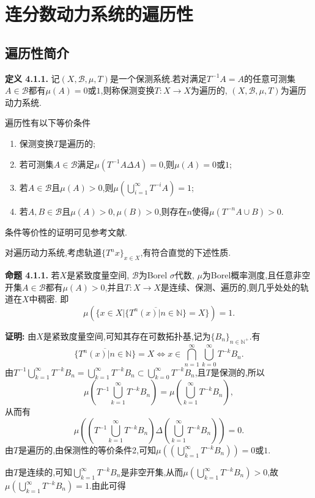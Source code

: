\section{连分数动力系统的遍历性}
\subsection{遍历性简介}
\textbf{定义 4.1.1.  }
记$(X,\mathcal{B},\mu,T)$是一个保测系统.若对满足$T^{-1}A=A$的任意可测集$A\in\mathcal{B}$都有$\mu(A)=0$或$1$,则称保测变换$T:X\to X$为遍历的, $(X,\mathcal{B},\mu,T)$为遍历动力系统.
\par
遍历性有以下等价条件
\begin{enumerate}
    \item 保测变换$T$是遍历的;
    \item 若可测集$A\in\mathcal{B}$满足$\mu(T^{-1}A\Delta A)=0$,则$\mu(A)=0$或$1$;
    \item 若$A\in\mathcal{B}$且$\mu(A)>0$,则$\mu(\bigcup\limits_{i=1}^{\infty}T^{-i}A)=1$;
    \item 若$A,B\in\mathcal{B}$且$\mu(A)>0,\mu(B)>0$,则存在$n$使得$\mu(T^{-n}A\cup B)>0$.
\end{enumerate}\par
条件等价性的证明可见参考文献\cite{Ergodic_Sun,Ergodic_theory}.\par
对遍历动力系统,考虑轨道$\{T^{n}x\}_{x\in X}$,有符合直觉的下述性质.\par
\textbf{命题 4.1.1.  }\textsuperscript{\cite{Ergodic_Sun,Ergodic_theory}}
若$X$是紧致度量空间, $\mathcal{B}$为Borel  $\sigma$代数, $\mu$为Borel概率测度,且任意非空开集$A\in\mathcal{B}$都有$\mu(A)>0$,并且$T:X\to X$是连续、保测、遍历的,则几乎处处的轨道在$X$中稠密.
即
$$\mu(\{x\in X|\overline{\{T^{n}(x)|n\in\mathbb{N}\}}=X\})=1.$$
\par
\textbf{证明:  }
由$X$是紧致度量空间,可知其存在可数拓扑基,记为$\{B_n\}_{n\in\mathbb{N}^+}$.有
$$\overline{\{T^{n}(x)|n\in\mathbb{N}\}}=X\iff x\in\bigcap_{n=1}^{\infty}\bigcup_{k=0}^{\infty}T^{-k}B_n.$$
由$T^{-1}\bigcup_{k=1}^{\infty}T^{-k}B_n=\bigcup_{k=1}^{\infty}T^{-k}B_n\subset\bigcup_{k=0}^{\infty}T^{-k}B_n$,且$T$是保测的,所以
$$\mu\left(T^{-1}\bigcup_{k=1}^{\infty}T^{-k}B_n\right)=\mu\left(\bigcup_{k=1}^{\infty}T^{-k}B_n\right),$$
从而有
$$\mu\left(\left(T^{-1}\bigcup_{k=1}^{\infty}T^{-k}B_n\right)\Delta \left(\bigcup_{k=1}^{\infty}T^{-k}B_n\right)\right)=0.$$
由$T$是遍历的,由保测性的等价条件2,可知$\mu\left(\left(\bigcup_{k=1}^{\infty}T^{-k}B_n\right)\right)=0$或$1$.\par
由$T$是连续的,可知$\bigcup_{k=1}^{\infty}T^{-k}B_n$是非空开集,从而$\mu(\bigcup_{k=1}^{\infty}T^{-k}B_n)>0$,故$\mu(\bigcup_{k=1}^{\infty}T^{-k}B_n)=1$.由此可得
